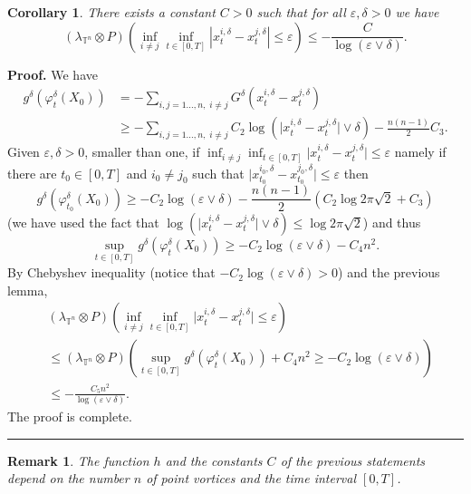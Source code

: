 \documentclass[11pt,a4paper]{article}%
\newtheorem{corollary}[theorem]{Corollary}
\newtheorem{remark}[theorem]{Remark}
\newenvironment{proof}[1][Proof]{\textbf{#1.} }{\ \rule{0.5em}{0.5em}}
\begin{document}
\begin{corollary}
There exists a constant $C>0$ such that for all $\varepsilon,\delta>0$ we
have
\[
( \lambda_{{\mathbb{T}}^{n}}\otimes P) ( \inf_{i\neq j}\inf_{t\in[ 0,T] }|
x_{t}^{i,\delta}-x_{t}^{j,\delta}| \leq\varepsilon) \leq-\frac{C}{\log(
\varepsilon\vee\delta) }.
\]

\end{corollary}

\begin{proof}
We have%
\begin{align*}
g^{\delta}( \varphi_{t}^{\delta}( X_{0}) )  &  =-\sum_{i,j=1...,n,\;i\neq
j}G^{\delta}( x_{t}^{i,\delta}-x_{t}^{j,\delta})\\
&  \geq-\sum_{i,j=1...,n,\;i\neq j}C_{2}\log( \vert x_{t}^{i,\delta}%
-x_{t}^{j,\delta}\vert\vee\delta) -\frac{n( n-1) }{2}C_{3}.
\end{align*}
Given $\varepsilon,\delta>0$, smaller than one, if
$
\inf_{i\neq j}\inf_{t\in[ 0,T] }\vert x_{t}^{i,\delta}-x_{t}^{j,\delta}%
\vert\leq\varepsilon
$
namely if there are $t_{0}\in[ 0,T] $ and $i_{0}\neq j_{0}$ such that $\vert
x_{t_{0}}^{i_{0},\delta}-x_{t_{0}}^{j_{0},\delta}\vert\leq\varepsilon$ then%
\[
g^{\delta}( \varphi_{t_{0}}^{\delta}( X_{0}) ) \geq-C_{2}\log( \varepsilon
\vee\delta) -\frac{n( n-1) }{2}( C_{2}\log2\pi\sqrt{2}+C_{3})
\]
(we have used the fact that $\log( \vert x_{t}^{i,\delta}-x_{t}^{j,\delta
}\vert\vee\delta) \leq\log2\pi\sqrt{2}$) and thus
\[
\sup_{t\in[ 0,T] }g^{\delta}( \varphi_{t}^{\delta}( X_{0}) ) \geq-C_{2}\log(
\varepsilon\vee\delta) -C_{4}n^{2}.
\]
By Chebyshev inequality (notice that $-C_{2}\log( \varepsilon\vee\delta) >0$)
and the previous lemma,
\begin{align*}
&  ( \lambda_{{\mathbb{T}}^{n}}\otimes P) ( \inf_{i\neq j}\inf_{t\in[ 0,T]
}\vert x_{t}^{i,\delta}-x_{t}^{j,\delta}\vert\leq\varepsilon)\\
&  \leq( \lambda_{{\mathbb{T}}^{n}}\otimes P) ( \sup_{t\in[ 0,T] }g^{\delta}(
\varphi_{t}^{\delta}( X_{0}) ) +C_{4}n^{2}\geq-C_{2}\log( \varepsilon
\vee\delta) )\\
&  \leq-\frac{C_{5}n^{2}}{\log( \varepsilon\vee\delta) }.
\end{align*}
The proof is complete.
\end{proof}

\begin{remark}
The function $h$ and the constants $C$ of the previous statements depend on
the number $n$ of point vortices and the time interval $[ 0,T] $.
\end{remark}
\end{document}

